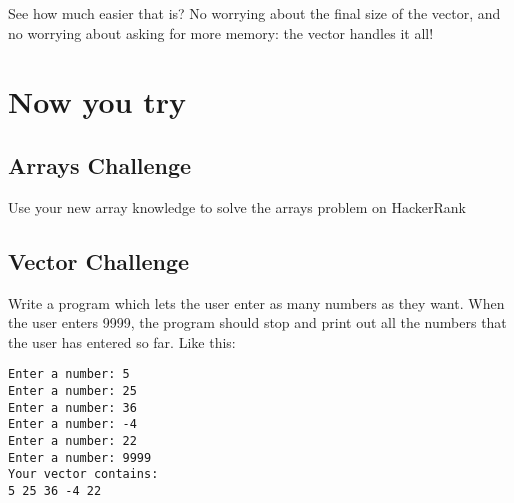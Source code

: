 \documentclass[a4paper,12pt]{article} %
\begin{document}
\clearpage

\vspace{5mm}


\noindent
See how much easier that is? No worrying about the final size of the vector, and no worrying about asking for more memory: the vector handles it all!

\section{Now you try}

\subsection{Arrays Challenge}

Use your new array knowledge to solve the arrays problem on HackerRank

\subsection{Vector Challenge}

Write a program which lets the user enter as many numbers as they want. When the user enters 9999, the program should stop and print out all the numbers that the user has entered so far. Like this:

\begin{verbatim}
Enter a number: 5
Enter a number: 25
Enter a number: 36
Enter a number: -4
Enter a number: 22
Enter a number: 9999
Your vector contains:
5 25 36 -4 22
\end{verbatim}
\end{document}
